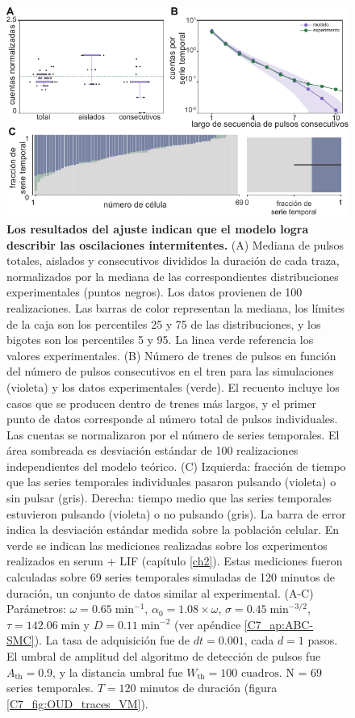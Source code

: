 \documentclass[./main.tex]{subfiles}
\begin{document}
\begin{figure}
    \centering
    \includegraphics[width=1\columnwidth]{figures/chapter7/C7_OUD_validation.pdf} 
    \caption{\textbf{Los resultados del ajuste indican que el modelo logra describir las oscilaciones intermitentes.} (A) Mediana de pulsos totales, aislados y consecutivos divididos la duración de cada traza, normalizados por la mediana de las correspondientes distribuciones experimentales (puntos negros). Los datos provienen de 100 realizaciones. Las barras de color representan la mediana, los límites de la caja son los percentiles 25 y 75 de las distribuciones, y los bigotes son los percentiles 5 y 95. La linea verde referencia los valores experimentales. (B) Número de trenes de pulsos en función del número de pulsos consecutivos en el tren para las simulaciones (violeta) y los datos experimentales (verde). El recuento incluye los casos que se producen dentro de trenes más largos, y el primer punto de datos corresponde al número total de pulsos individuales. Las cuentas se normalizaron por el número de series temporales. El área sombreada es desviación estándar de 100 realizaciones independientes del modelo teórico. (C) Izquierda: fracción de tiempo que las series temporales individuales pasaron pulsando (violeta) o sin pulsar (gris). Derecha: tiempo medio que las series temporales estuvieron pulsando (violeta) o no pulsando (gris). La barra de error indica la desviación estándar medida sobre la población celular. En verde se indican las mediciones realizadas sobre los experimentos realizados en serum + LIF (capítulo \ref{ch2}). Estas mediciones fueron calculadas sobre 69 series temporales simuladas de 120 minutos de duración, un conjunto de datos similar al experimental. (A-C) Parámetros:  $\omega = 0.65 \; \text{min}^{-1}$, $\alpha_0 = 1.08 \times \omega$, $ \sigma = 0.45 \; \text{min}^{-3/2}$, $\tau = 142.06 \; \text{min} $ y $D = 0.11 \; \text{min}^{-2}$ (ver apéndice \ref{C7_ap:ABC-SMC}). La tasa de adquisición fue de $dt = 0.001$, cada $d = 1$ pasos. El umbral de amplitud del algoritmo de detección de pulsos fue $A_{\text{th}} = 0.9$, y la distancia umbral fue $W_{\text{th}} = 100\text{ cuadros}$. N = $69$ series temporales. $T = 120$ minutos de duración (figura \ref{C7_fig:OUD_traces_VM}).}
    \label{C7_fig:OUD_param_evaluation}
\end{figure} 
\end{document}
